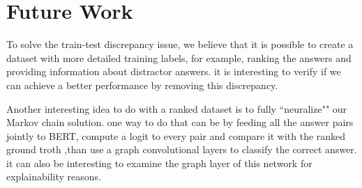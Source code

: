 \documentclass{article}
\begin{document}
\section{Future Work}
To solve the train-test discrepancy issue, we believe that it is possible to create a dataset with more detailed training labels, for example, ranking the answers and providing information about distractor answers. it is interesting to verify if we can achieve a better performance by removing this discrepancy.

Another interesting idea to do with a ranked dataset is to fully ``neuralize"" our Markov chain solution. one way to do that can be by feeding all the answer pairs jointly to  BERT, compute a logit to every pair and compare it with the ranked ground troth ,than use a graph convolutional layers to classify the correct answer. it can also be interesting to examine the graph layer of this network for explainability reasons.  

\nocite{langley00}






\end{document}
